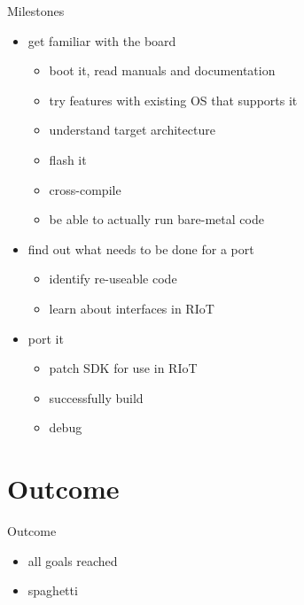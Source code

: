 \documentclass[9pt]{beamer}
\begin{document}
\begin{frame}{Milestones}
 \begin{itemize}
 \item get familiar with the board
 	\begin{itemize}
 	\item boot it, read manuals and documentation
 	\item try features with existing OS that supports it
 	\item understand target architecture
 	\item flash it
 	\item cross-compile
 	\item be able to actually run bare-metal code
 	\end{itemize}
 \item find out what needs to be done for a port
 	\begin{itemize}
 	\item identify re-useable code
 	\item learn about interfaces in RIoT
 	\end{itemize}
 \item port it
 	\begin{itemize}
 	\item patch SDK for use in RIoT
 	\item successfully build
 	\item debug
 	\end{itemize}
 \end{itemize}
\end{frame}


\section{Outcome}

\begin{frame}{Outcome}
\pause
 \begin{itemize}
  \item all goals reached
\pause
 	\item spaghetti
 \end{itemize}
\end{frame}
\end{document}
